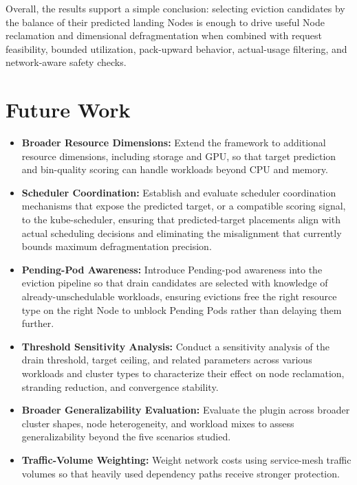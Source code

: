 Overall, the results support a simple conclusion: selecting eviction candidates by the balance of their predicted landing Nodes is enough to drive useful Node reclamation and dimensional defragmentation when combined with request feasibility, bounded utilization, pack-upward behavior, actual-usage filtering, and network-aware safety checks.

\section{Future Work}
\label{sec:future_works}

\begin{itemize}
    \item \textbf{Broader Resource Dimensions:} Extend the framework to additional resource dimensions, including storage and GPU, so that target prediction and bin-quality scoring can handle workloads beyond CPU and memory.
    \item \textbf{Scheduler Coordination:} Establish and evaluate scheduler coordination mechanisms that expose the predicted target, or a compatible scoring signal, to the kube-scheduler, ensuring that predicted-target placements align with actual scheduling decisions and eliminating the misalignment that currently bounds maximum defragmentation precision.
    \item \textbf{Pending-Pod Awareness:} Introduce Pending-pod awareness into the eviction pipeline so that drain candidates are selected with knowledge of already-unschedulable workloads, ensuring evictions free the right resource type on the right Node to unblock Pending Pods rather than delaying them further.
    \item \textbf{Threshold Sensitivity Analysis:} Conduct a sensitivity analysis of the drain threshold, target ceiling, and related parameters across various workloads and cluster types to characterize their effect on node reclamation, stranding reduction, and convergence stability.
    \item \textbf{Broader Generalizability Evaluation:} Evaluate the plugin across broader cluster shapes, node heterogeneity, and workload mixes to assess generalizability beyond the five scenarios studied.
    \item \textbf{Traffic-Volume Weighting:} Weight network costs using service-mesh traffic volumes so that heavily used dependency paths receive stronger protection.
\end{itemize}
